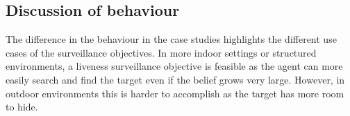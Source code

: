 \subsection{Discussion of behaviour}
The difference in the behaviour in the case studies highlights the different use cases of the surveillance objectives. In more indoor settings or structured environments, a liveness surveillance objective is feasible as the agent can more easily search and find the target even if the belief grows very large. However, in outdoor environments this is harder to accomplish as the target has more room to hide. 